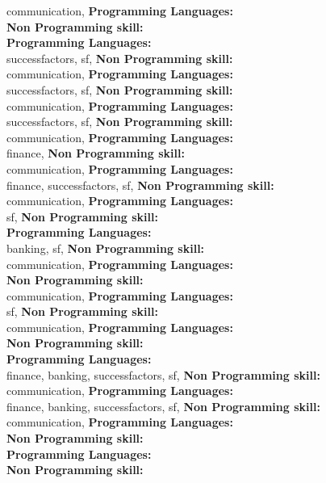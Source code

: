 communication, \textbf{Programming Languages:} \\
\textbf{Non Programming skill:} \\
\textbf{Programming Languages:} \\
successfactors, sf, \textbf{Non Programming skill:} \\
communication, \textbf{Programming Languages:} \\
successfactors, sf, \textbf{Non Programming skill:} \\
communication, \textbf{Programming Languages:} \\
successfactors, sf, \textbf{Non Programming skill:} \\
communication, \textbf{Programming Languages:} \\
finance, \textbf{Non Programming skill:} \\
communication, \textbf{Programming Languages:} \\
finance, successfactors, sf, \textbf{Non Programming skill:} \\
communication, \textbf{Programming Languages:} \\
sf, \textbf{Non Programming skill:} \\
\textbf{Programming Languages:} \\
banking, sf, \textbf{Non Programming skill:} \\
communication, \textbf{Programming Languages:} \\
\textbf{Non Programming skill:} \\
communication, \textbf{Programming Languages:} \\
sf, \textbf{Non Programming skill:} \\
communication, \textbf{Programming Languages:} \\
\textbf{Non Programming skill:} \\
\textbf{Programming Languages:} \\
finance, banking, successfactors, sf, \textbf{Non Programming skill:} \\
communication, \textbf{Programming Languages:} \\
finance, banking, successfactors, sf, \textbf{Non Programming skill:} \\
communication, \textbf{Programming Languages:} \\
\textbf{Non Programming skill:} \\
\textbf{Programming Languages:} \\
\textbf{Non Programming skill:} \\

